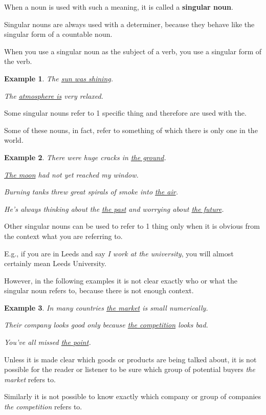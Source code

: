 \documentclass[oneside]{book}
\numberwithin{equation}{section}
\newtheorem{example}{Example}[section]
\begin{document}
%
When a noun is used with such a meaning, it is called a \textbf{singular noun}.

Singular nouns are always used with a determiner, because they behave like the singular form of a countable noun.

%
\noindent{} When you use a singular noun as the subject of a verb, you use a singular form of the verb.
\begin{example}
    The \underline{sun was shining}.
    
    The \underline{atmosphere is} very relaxed.
\end{example} 
%
\noindent{} Some singular nouns refer to 1 specific thing and therefore are used with the.

Some of these nouns, in fact, refer to something of which there is only one in the world.
\begin{example}
    There were huge cracks in \underline{the ground}.
    
    \underline{The moon} had not yet reached my window.
    
    Burning tanks threw great spirals of smoke into \underline{the air}.
    
    He's always thinking about the \underline{the past} and worrying about \underline{the future}.
\end{example}
%
\noindent{} Other singular nouns can be used to refer to 1 thing only when it is obvious from the context what you are referring to.

E.g., if you are in Leeds and say \textit{I work at the university}, you will almost certainly mean Leeds University.

%
However, in the following examples it is not clear exactly who or what the singular noun refers to, because there is not enough context.
\begin{example}
    In many countries \underline{the market} is small numerically.
    
    Their company looks good only because \underline{the competition} looks bad.
    
    You've all missed \underline{the point}.
\end{example}
Unless it is made clear which goods or products are being talked about, it is not possible for the reader or listener to be sure which group of potential buyers \textit{the market} refers to.

Similarly it is not possible to know exactly which company or group of companies \textit{the competition} refers to.
\end{document}
